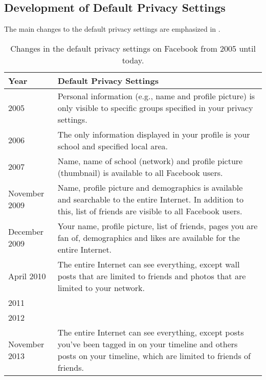 \subsection{Development of Default Privacy Settings}

The main changes to the default privacy settings are emphasized in . 

\begin{center}
\begin{table}
\caption{\label{tab:dps}Changes in the default privacy settings on Facebook from 2005 until today. \cite{EvoPriv,PrivTimeline}}
    \begin{tabular}{ | l | p{9cm} |}
    \hline
    \textbf{Year} & \textbf{Default Privacy Settings} \\ 
    \hline
    2005 & Personal information (e.g., name and profile picture) is 	only visible to specific groups specified in your privacy 			settings.\\ 
    \hline
    2006 & The only information displayed in your profile is your 		school and specified local area. \\ 
    \hline
    2007 & Name, name of school (network) and profile picture 			(thumbnail) is available to all Facebook users.\\
    \hline
    November 2009 & Name, profile picture and demographics is 			available and searchable to the entire Internet. In addition to 	this, list of friends are visible to all Facebook users.\\
	\hline
    December 2009 & Your name, profile picture, list of friends, 		pages you are fan of, demographics and likes are available for 		the entire Internet.\\
    \hline
    April 2010 & The entire Internet can see everything, except 		wall posts that are limited to friends and photos that are 			limited to your network. \\
    \hline
    2011 &  \\
    \hline
    2012 & \\
    \hline
    November 2013 & The entire Internet can see everything, except posts you've been tagged in on your timeline and others posts on your timeline, which are limited to friends of friends. \\ 
    \hline
    \end{tabular}
   \end{table}
\end{center}


